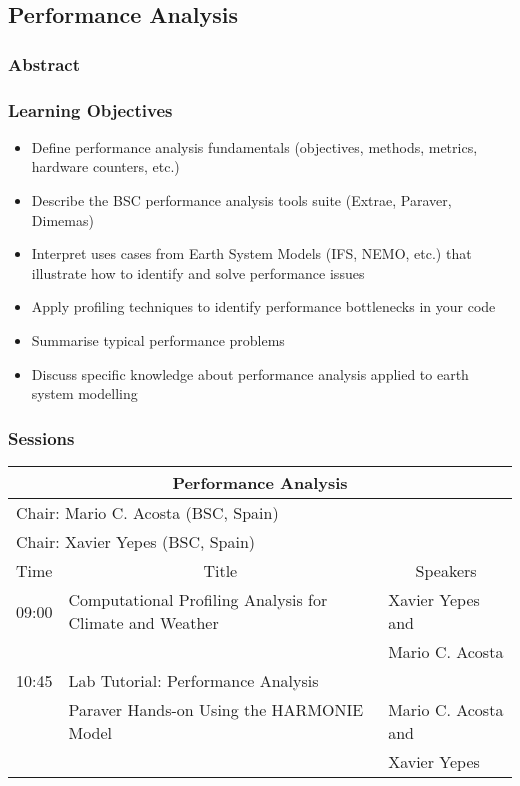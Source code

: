 \subsection{Performance Analysis}

\subsubsection{Abstract}

\subsubsection{Learning Objectives}

\begin{itemize}

\item Define performance analysis fundamentals (objectives, methods, metrics, hardware counters, etc.)
\item Describe the BSC performance analysis tools suite (Extrae, Paraver, Dimemas)
\item Interpret uses cases from Earth System Models (IFS, NEMO, etc.) that illustrate how to identify and solve performance issues
\item Apply profiling techniques to identify performance bottlenecks in your code
\item Summarise typical performance problems
\item Discuss specific knowledge about performance analysis applied to earth system modelling

\end{itemize}

\subsubsection{Sessions}

\begin{table}[H]
\begin{center}
\begin{tabular}{|l|l|l|}
\hline
\multicolumn{3}{|c|}{\textbf{Performance Analysis}} \\ \hline
\multicolumn{3}{|l|}{Chair: Mario C. Acosta (BSC, Spain)} \\
\multicolumn{3}{|l|}{Chair: Xavier Yepes (BSC, Spain)} \\ \hline \hline
Time & \multicolumn{1}{c|}{Title} & \multicolumn{1}{c|}{Speakers} \\ \hline \hline
09:00 & Computational Profiling Analysis for Climate and Weather & Xavier Yepes and \\
      &                                                          & Mario C. Acosta \\ \hline
10:45 & Lab Tutorial: Performance Analysis & \\ \hline
      & Paraver Hands-on Using the HARMONIE Model & Mario C. Acosta and \\
      &                                           & Xavier Yepes \\ \hline
\hline
\end{tabular}
\end{center}
\end{table}

